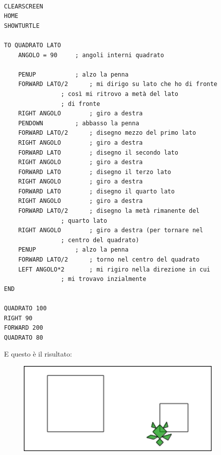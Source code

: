 \vskip 1cm

\lstset{extendedchars=true, basicstyle=\scriptsize} 
\begin{lstlisting}[frame=single]  % Start your code-block

CLEARSCREEN
HOME
SHOWTURTLE

TO QUADRATO LATO
	ANGOLO = 90		; angoli interni quadrato

	PENUP			; alzo la penna
	FORWARD LATO/2		; mi dirigo su lato che ho di fronte
				; così mi ritrovo a metà del lato 
				; di fronte
	RIGHT ANGOLO		; giro a destra
	PENDOWN			; abbasso la penna 
	FORWARD LATO/2		; disegno mezzo del primo lato 
	RIGHT ANGOLO		; giro a destra
	FORWARD LATO		; disegno il secondo lato
	RIGHT ANGOLO		; giro a destra
	FORWARD LATO		; disegno il terzo lato
	RIGHT ANGOLO		; giro a destra
	FORWARD LATO		; disegno il quarto lato
	RIGHT ANGOLO		; giro a destra
	FORWARD LATO/2		; disegno la metà rimanente del
				; quarto lato
	RIGHT ANGOLO		; giro a destra (per tornare nel
				; centro del quadrato)
	PENUP			; alzo la penna
	FORWARD LATO/2		; torno nel centro del quadrato
	LEFT ANGOLO*2		; mi rigiro nella direzione in cui 
				; mi trovavo inzialmente
END

QUADRATO 100
RIGHT 90
FORWARD 200
QUADRATO 80

\end{lstlisting}

\vskip 1cm

E questo è il risultato:

\vskip 0.5cm

\begin{figure}[H]
   \includegraphics[width=10.0cm,trim=4 4 8 4,clip]{./images/incapsulare/incapsulare-3.png}
   \label{inc-4}
\end{figure}

